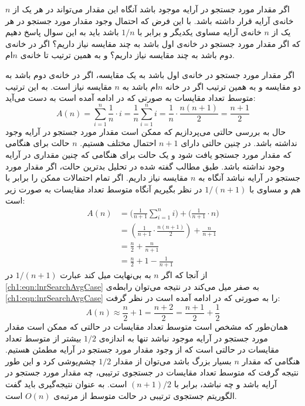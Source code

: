 {اگر مقدار مورد جستجو در آرایه موجود باشد آنگاه این مقدار می‌تواند در هر یک از {$n$} خانه‌ی آرایه قرار داشته باشد. با این فرض که احتمال وجود مقدار مورد جستجو در هر یک از {$n$} خانه‌ی آرایه مساوی یکدیگر و برابر با {$1/n$} باشد باید به این سوال پاسخ دهیم که اگر مقدار مورد جستجو در خانه‌ی اول باشد به چند مقایسه نیاز داریم؟ اگر در خانه‌ی دوم باشد به چند مقایسه نیاز داریم؟ و به همین ترتیب تا خانه‌ی {$n$}ام.

اگر مقدار مورد جستجو در خانه‌ی اول باشد به یک مقایسه، اگر در خانه‌ی دوم باشد به دو مقایسه و به همین ترتیب اگر در خانه {$n$}ام باشد به {$n$} مقایسه نیاز است. به این ترتیب متوسط تعداد مقایسات به صورتی که در ادامه آمده است به دست می‌آید:
\begin{displaymath}
A(n)=\sum_{i=1}^n{\frac{1}{n}\cdot i}=\frac{1}{n} \sum_{i=1}^n{ i}=\frac{1}{n}\cdot \frac{n(n+1)}{2}=\frac{n+1}{2}
\end{displaymath}
حال به بررسی حالتی می‌پردازیم که ممکن است مقدار مورد جستجو در آرایه وجود نداشته باشد. در چنین حالتی دارای {$n+1$} احتمال مختلف هستیم. {$n$} حالت برای هنگامی که مقدار مورد جستجو یافت شود و یک حالت برای هنگامی که چنین مقداری در آرایه وجود نداشته باشد. طبق مطالب گفته شده در تحلیل بدترین حالت، اگر مقدار مورد جستجو در آرایه نباشد آنگاه به {$n$} مقایسه نیاز داریم. اگر تمام احتمالات ممکن را برابر با هم و مساوی با {$1/(n+1)$} در نظر بگیریم آنگاه متوسط تعداد مقایسات به صورت زیر است:
\begin{align}
A(n) &= \biggl( \frac{1}{n+1} \sum_{i=1}^{n}{i} \biggr) + \biggl(\frac{1}{n+1}\cdot n \biggr) \nonumber\\
&=  \left( \frac{1}{n+1}\cdot  \frac{n(n+1)}{2} \right) + \frac{n}{n+1} \nonumber\\
&= \frac{n}{2} + \frac{n}{n+1} \nonumber\\
&= \frac{n}{2} + 1 - \frac{1}{n+1}\label{ch1:eqn:lnrSearchAvgCase}
\end{align}
از آنجا که اگر {$n$} به بی‌نهایت میل کند عبارت {$1/(n+1)$} در {\eqref{ch1:eqn:lnrSearchAvgCase}} به صفر میل می‌کند در نتیجه می‌توان رابطه‌ی {\eqref{ch1:eqn:lnrSearchAvgCase}} را به صورتی که در ادامه آمده است در نظر گرفت:
\begin{displaymath}
A(n)\approx\frac{n}{2}+1=\frac{n+2}{2}=\frac{n+1}{2}+\frac{1}{2}
\end{displaymath}
همان‌طور که مشخص است متوسط تعداد مقایسات در حالتی که ممکن است مقدار مورد جستجو در آرایه موجود نباشد تنها به اندازه‌ی {$1/2$} بیشتر از متوسط تعداد مقایسات در حالتی است که از وجود مقدار مورد جستجو در آرایه مطمئن هستیم. هنگامی که مقدار {$n$} بسیار بزرگ باشد می‌توان از مقدار {$1/2$} چشم‌پوشی کرد و این طور نتیجه گرفت که متوسط تعداد مقایسات در جستجوی ترتیبی، چه مقدار مورد جستجو در آرایه باشد و چه نباشد، برابر با {$(n+1)/2$} است. به عنوان نتیجه‌گیری باید گفت الگوریتم جستجوی ترتیبی در حالت متوسط از مرتبه‌ی {$O(n)$} است.

}
